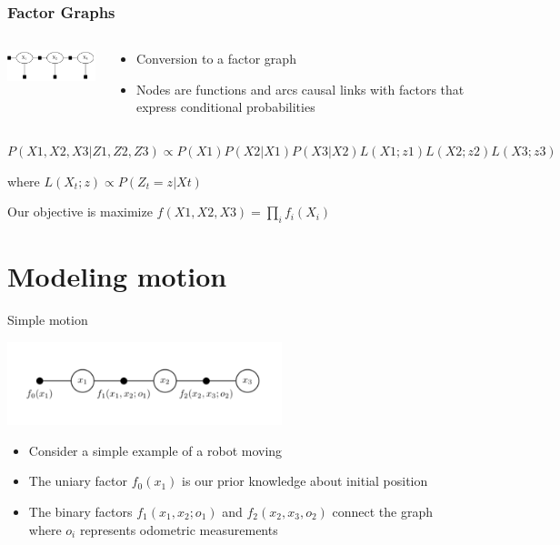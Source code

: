 \documentclass[10pt]{beamer}
\begin{document}
\begin{frame}
  \frametitle{Factor Graphs}
  \begin{columns}
    \begin{column}{4cm}
      \includegraphics[width=3.9cm]{hmm-FG}
    \end{column}
    \begin{column}{3.5cm}
      \begin{itemize}
        \item Conversion to a factor graph 
        \item Nodes are functions and arcs causal links with factors that express conditional probabilities 
      \end{itemize}
    \end{column}
  \end{columns}
  \vspace{5mm} 

  \centerline{\small $P(X1,X2,X3|Z1,Z2,Z3) \propto P(X1)P(X2|X1)P(X3|X2)L(X1;z1)L(X2;z2)L(X3;z3)$}
  \vspace{5mm} 

  \centerline{\small where $L(X_t;z) \propto P(Z_t=z|Xt)$}
  \vspace{5mm} 

  \centerline{\small Our objective is maximize $f(X1,X2,X3)=\prod_i f_i(X_i)$}
\end{frame}

\section{Modeling motion}

\begin{frame}{Simple motion}
  \centerline{\includegraphics[width=8cm]{FactorGraph}}
  \begin{itemize}
    \item Consider a simple example of a robot moving
    \item The uniary factor $f_0(x_1)$ is our prior knowledge about initial position
    \item The binary factors $f_1(x_1, x_2; o_1)$ and $f_2(x_2, x_3, o_2)$ connect the graph where $o_i$ represents odometric measurements 
  \end{itemize}
\end{frame}
\end{document}
